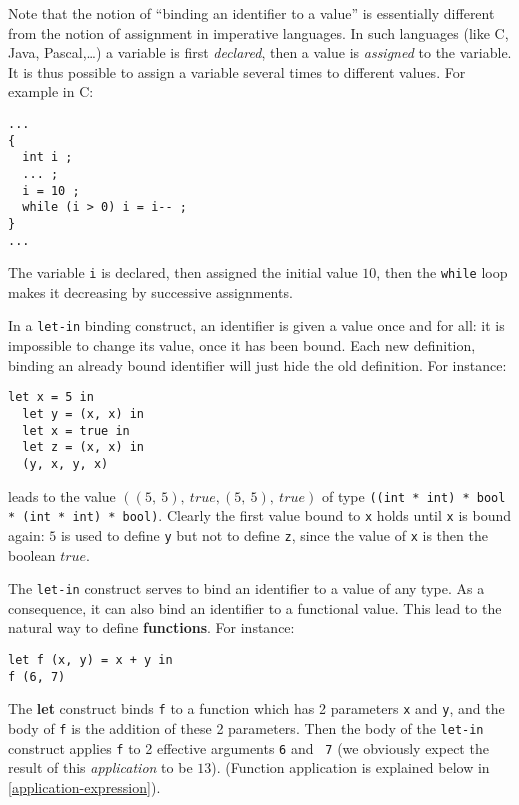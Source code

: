 \medskip
{}
Note that the notion of ``binding an identifier to a value'' is
essentially different from the
notion of assignment in imperative languages. In such languages (like
C, Java, Pascal,\ldots) a variable is first {\em declared}, then a value is
{\em assigned} to the variable. It is thus possible to assign a variable
several times to different values. For example in C:
{\scriptsize
\begin{lstlisting}
...
{
  int i ;
  ... ;
  i = 10 ;
  while (i > 0) i = i-- ;
}
...
\end{lstlisting}
}
The variable {\tt i} is declared, then assigned the initial value
$10$, then the {\tt while} loop makes it decreasing by successive
assignments.

In a {\tt let-in} binding construct, an identifier is given a value
once and for all: it is impossible to change its  value, once it
has been bound.
Each new definition, binding an already bound identifier will just hide the
old definition. For instance:
{\scriptsize
\begin{lstlisting}
let x = 5 in
  let y = (x, x) in
  let x = true in
  let z = (x, x) in
  (y, x, y, x)
\end{lstlisting}
}
leads to the value $((5,\ 5),\ true, (5,\ 5),\ true)$
of type {\tt ((int * int) * bool * (int * int) * bool)}. Clearly the
first value bound to {\tt x}  holds until {\tt x}
is bound again: $5$ is used to define {\tt y} but not to define
{\tt z}, since the value of {\tt x} is then the boolean $true$.

\medskip

The {\tt let-in} construct serves to bind an identifier to a value of
any type.  As a consequence, it can also bind an identifier to a
functional value.  This lead to the natural way to define {\bf
  functions}. For instance:

 {\scriptsize
\begin{lstlisting}
let f (x, y) = x + y in
f (6, 7)
\end{lstlisting}
}

The {\bf let} construct binds {\tt f} to a function which has 2
parameters {\tt x} and {\tt y}, and the body of {\tt f} is the
addition of these 2 parameters. Then the body of the {\tt let-in}
construct applies {\tt f} to 2 effective arguments {\tt 6} and {\tt
  7} (we obviously expect the result of this {\em application} to be
$13$).  (Function application is explained below in
\ref{application-expression}). %


